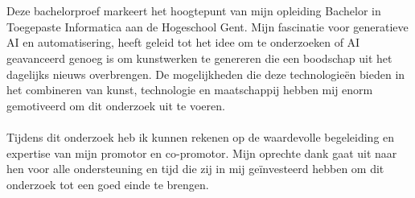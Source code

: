 
\chapter*{}%
\label{ch:voorwoord}

Deze bachelorproef markeert het hoogtepunt van mijn opleiding Bachelor in Toegepaste Informatica aan de Hogeschool Gent. Mijn fascinatie voor generatieve AI en automatisering, heeft geleid tot het idee om te onderzoeken of AI geavanceerd genoeg is om kunstwerken te genereren die een boodschap uit het dagelijks nieuws overbrengen. De mogelijkheden die deze technologieën bieden in het combineren van kunst, technologie en maatschappij hebben mij enorm gemotiveerd om dit onderzoek uit te voeren. \\
\\
Tijdens dit onderzoek heb ik kunnen rekenen op de waardevolle begeleiding en expertise van mijn promotor en co-promotor. Mijn oprechte dank gaat uit naar hen voor alle ondersteuning en tijd die zij in mij geïnvesteerd hebben om dit onderzoek tot een goed einde te brengen.